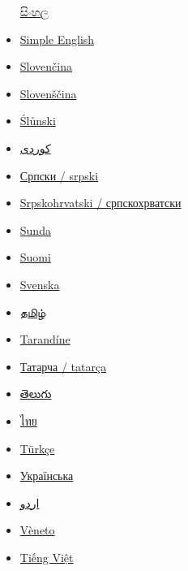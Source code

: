\documentclass[
]{article}
\begin{document}
\begin{itemize}
  \href{https://si.wikipedia.org/wiki/\%E0\%B6\%A2\%E0\%B7\%96\%E0\%B6\%BD\%E0\%B7\%8A_(SI_\%E0\%B6\%92\%E0\%B6\%9A\%E0\%B6\%9A\%E0\%B6\%BA)}{{සිංහල}}
\item
  \href{https://simple.wikipedia.org/wiki/Joule}{{Simple English}}
\item
  \href{https://sk.wikipedia.org/wiki/Joule}{{Slovenčina}}
\item
  \href{https://sl.wikipedia.org/wiki/D\%C5\%BEul}{{Slovenščina}}
\item
  \href{https://szl.wikipedia.org/wiki/D\%C5\%BCul}{{Ślůnski}}
\item
  \href{https://ckb.wikipedia.org/wiki/\%D8\%AC\%D9\%88\%D9\%88\%DA\%B5}{{کوردی}}
\item
  \href{https://sr.wikipedia.org/wiki/\%D0\%8F\%D1\%83\%D0\%BB}{{Српски
  / srpski}}
\item
  \href{https://sh.wikipedia.org/wiki/D\%C5\%BEul}{{Srpskohrvatski /
  српскохрватски}}
\item
  \href{https://su.wikipedia.org/wiki/Joule}{{Sunda}}
\item
  \href{https://fi.wikipedia.org/wiki/Joule}{{Suomi}}
\item
  \href{https://sv.wikipedia.org/wiki/Joule}{{Svenska}}
\item
  \href{https://ta.wikipedia.org/wiki/\%E0\%AE\%9A\%E0\%AF\%82\%E0\%AE\%B2\%E0\%AF\%8D_(\%E0\%AE\%85\%E0\%AE\%B2\%E0\%AE\%95\%E0\%AF\%81)}{{தமிழ்}}
\item
  \href{https://roa-tara.wikipedia.org/wiki/Joule}{{Tarandíne}}
\item
  \href{https://tt.wikipedia.org/wiki/\%D0\%94\%D0\%B6\%D0\%BE\%D1\%83\%D0\%BB\%D1\%8C}{{Татарча
  / tatarça}}
\item
  \href{https://te.wikipedia.org/wiki/\%E0\%B0\%9C\%E0\%B1\%8C\%E0\%B0\%B2\%E0\%B1\%8D}{{తెలుగు}}
\item
  \href{https://th.wikipedia.org/wiki/\%E0\%B8\%88\%E0\%B8\%B9\%E0\%B8\%A5_(\%E0\%B8\%AB\%E0\%B8\%99\%E0\%B9\%88\%E0\%B8\%A7\%E0\%B8\%A2)}{{ไทย}}
\item
  \href{https://tr.wikipedia.org/wiki/Joule}{{Türkçe}}
\item
  \href{https://uk.wikipedia.org/wiki/\%D0\%94\%D0\%B6\%D0\%BE\%D1\%83\%D0\%BB\%D1\%8C}{{Українська}}
\item
  \href{https://ur.wikipedia.org/wiki/\%D8\%AC\%D9\%88\%D9\%84}{{اردو}}
\item
  \href{https://vec.wikipedia.org/wiki/Joule}{{Vèneto}}
\item
  \href{https://vi.wikipedia.org/wiki/Joule}{{Tiếng Việt}}

\end{itemize}
\end{document}
